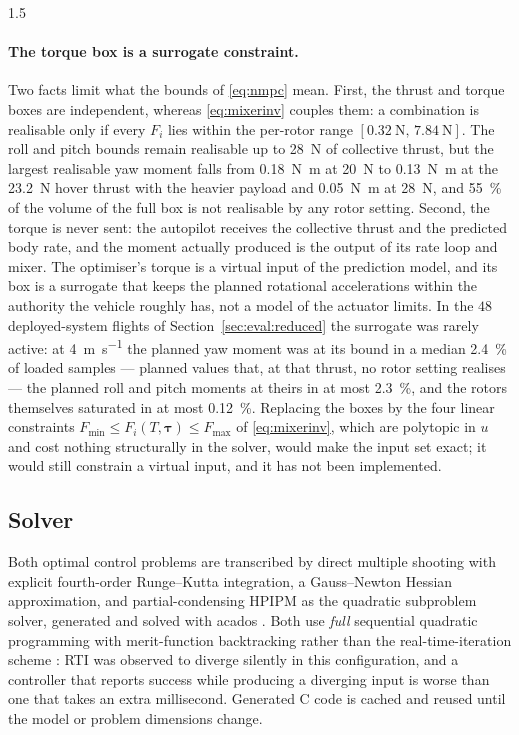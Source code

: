 \begin{spacing}{1.5}
\paragraph{The torque box is a surrogate constraint.} Two facts limit what the
bounds of \eqref{eq:nmpc} mean. First, the thrust and torque boxes are
independent, whereas \eqref{eq:mixerinv} couples them: a combination is
realisable only if every $F_i$ lies within the per-rotor range
$[\SI{0.32}{\newton},\,\SI{7.84}{\newton}]$. The roll and pitch bounds remain
realisable up to \SI{28}{\newton} of collective thrust, but the largest
realisable yaw moment falls from \SI{0.18}{\newton\meter} at \SI{20}{\newton} to
\SI{0.13}{\newton\meter} at the \SI{23.2}{\newton} hover thrust with the heavier
payload and \SI{0.05}{\newton\meter} at \SI{28}{\newton}, and \SI{55}{\percent} of
the volume of the full box is not realisable by any rotor setting. Second, the
torque is never sent: the autopilot receives the collective thrust and the
predicted body rate, and the moment actually produced is the output of its rate
loop and mixer. The optimiser's torque is a virtual input of the prediction
model, and its box is a surrogate that keeps the planned rotational
accelerations within the authority the vehicle roughly has, not a model of the
actuator limits. In the $48$ deployed-system flights of
Section~\ref{sec:eval:reduced} the surrogate was rarely active: at
\SI{4}{\meter\per\second} the planned yaw moment was at its bound in a median
\SI{2.4}{\percent} of loaded samples --- planned values that, at that thrust, no
rotor setting realises --- the planned roll and pitch moments at theirs in at
most \SI{2.3}{\percent}, and the rotors themselves saturated in at most
\SI{0.12}{\percent}. Replacing the boxes by the four linear constraints
$F_{\min}\le F_i(T,\bm\tau)\le F_{\max}$ of \eqref{eq:mixerinv}, which are
polytopic in $u$ and cost nothing structurally in the solver, would make the
input set exact; it would still constrain a virtual input, and it has not been
implemented.

\subsection{Solver}\label{sec:frame:solver}

Both optimal control problems are transcribed by direct multiple shooting with
explicit fourth-order Runge--Kutta integration, a Gauss--Newton Hessian
approximation, and partial-condensing HPIPM \cite{hpipm} as the quadratic
subproblem solver, generated and solved with acados \cite{acados}. Both use
\emph{full} sequential quadratic programming with merit-function backtracking
rather than the real-time-iteration scheme \cite{diehl2005rti}: RTI was observed
to diverge silently in this configuration, and a controller that reports success
while producing a diverging input is worse than one that takes an extra
millisecond. Generated C code is cached and reused until the model or problem
dimensions change.


\end{spacing}
